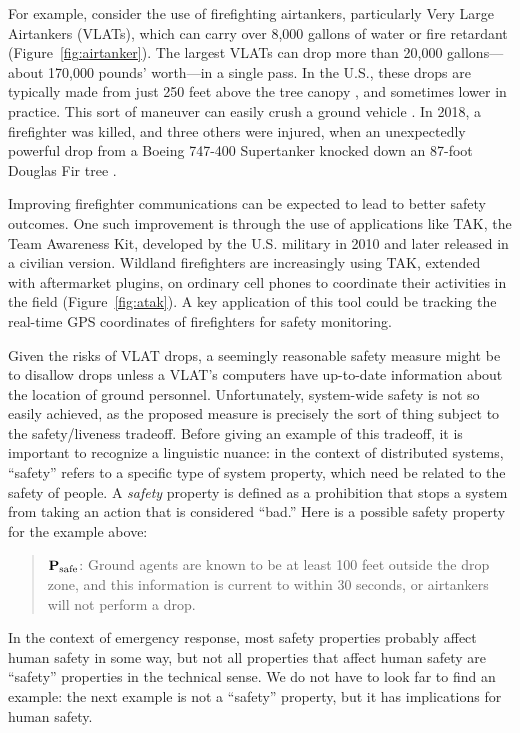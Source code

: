 \documentclass[]             %
{NASA}                       %
\theoremstyle{definition}
\begin{document}
For example, consider the use of firefighting airtankers, particularly
Very Large Airtankers (VLATs), which can carry over 8,000 gallons of
water or fire retardant \cite{2019:airtankerops}
(Figure~\ref{fig:airtanker}). The largest VLATs can drop more than
20,000 gallons---about 170,000 pounds' worth---in a single pass. In
the U.S., these drops are typically made from just 250 feet above the
tree canopy \cite{2019:airtankerops}, and sometimes lower in
practice. This sort of maneuver can easily crush a ground vehicle
\cite{2019:stickney}. In 2018, a firefighter was killed, and three
others were injured, when an unexpectedly powerful drop from a Boeing
747-400 Supertanker knocked down an 87-foot Douglas Fir tree
\cite{2018:calfire}.

Improving firefighter communications can be expected to lead to better
safety outcomes. One such improvement is through the use of
applications like TAK, the Team Awareness Kit, developed by the
U.S. military in 2010 and later released in a civilian
version. Wildland firefighters are increasingly using TAK, extended
with aftermarket plugins, on ordinary cell phones to coordinate their
activities in the field (Figure~\ref{fig:atak}). A key application of
this tool could be tracking the real-time GPS coordinates of
firefighters for safety monitoring.

Given the risks of VLAT drops, a seemingly reasonable safety measure
might be to disallow drops unless a VLAT's computers have up-to-date
information about the location of ground personnel. Unfortunately,
system-wide safety is not so easily achieved, as the proposed measure
is precisely the sort of thing subject to the safety/liveness
tradeoff. Before giving an example of this tradeoff, it is important to recognize a linguistic nuance: in
the context of distributed systems, ``safety'' refers to a specific
type of system property, which need be related to the
safety of people. A \emph{safety} property is defined as a prohibition that stops
a system from taking an action that is considered ``bad.'' Here
is a possible safety property for the example above:
\begin{quote}
  $\textbf{P}_\textrm{safe}$: Ground agents are known to be at least
  100 feet outside the drop zone, and this information is current to
  within 30 seconds, or airtankers will not perform a drop.
\end{quote}
In the context of emergency response, most safety properties probably affect human safety in some way, but not all properties that affect human safety are ``safety'' properties in the technical sense. We do not have to look far to find an example: the next example is not a ``safety'' property, but it has implications for human safety.
\end{document}
